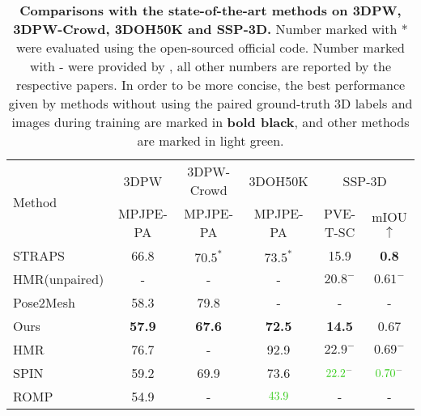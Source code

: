 \documentclass[journal]{IEEEtran}
\begin{document}
\begin{table*}[htbp]
\caption{\textbf{Comparisons with the state-of-the-art methods on 3DPW, 3DPW-Crowd, 3DOH50K and SSP-3D.} Number marked with * were evaluated using the open-sourced official code. Number marked with - were provided by \cite{STRAPS2020BMVC}, all other numbers are reported by the respective papers. In order to be more concise, the best performance given by methods without using the paired ground-truth 3D labels and images during training are marked in \textbf{bold black}, and other methods are marked in {\color[HTML]{32CB16}light green}.}
\begin{center}
\begin{tabular}{lccccc} 
\toprule
\multirow{2}{*}{Method}      & 3DPW          & 3DPW-Crowd & 3DOH50K   & \multicolumn{2}{c}{SSP-3D}  \\
                             & MPJPE-PA              & MPJPE-PA           & MPJPE-PA           & PVE-T-SC                          &mIOU$\uparrow$                               \\ 
\hline
STRAPS \cite{STRAPS2020BMVC}                     & 66.8                  & $70.5^{*}$            & $73.5^{*}$              & 15.9                              & \textbf{0.8}                       \\
HMR(unpaired) \cite{kanazawa2018end}            & -                     & -                  & -                  & $20.8^{-}$                        & $0.61^{-}$                         \\
Pose2Mesh \cite{Choi_2020_ECCV_Pose2Mesh}   & 58.3 &79.8               & - & -                & -                 \\
Ours                         & \textbf{57.9}         & \textbf{67.6}     & \textbf{72.5}      & \textbf{14.5}                     & 0.67                               \\ 
\hline
HMR   \cite{kanazawa2018end}                       & 76.7                  & -                  & 92.9               & $22.9^{-}$                        & $0.69^{-}$                         \\
SPIN \cite{kolotouros2019spin}                        & 59.2                  & 69.9               & 73.6               & ${\color[HTML]{32CB16} 22.2}^{-}$ & ${\color[HTML]{32CB16} 0.70}^{-}$  \\
ROMP   \cite{ROMP}                      & 54.9                  & -                  & ${\color[HTML]{32CB16} 43.9}$               & -                                 & -                                  \\


\end{tabular}
\end{center}
\end{table*}
\end{document}
